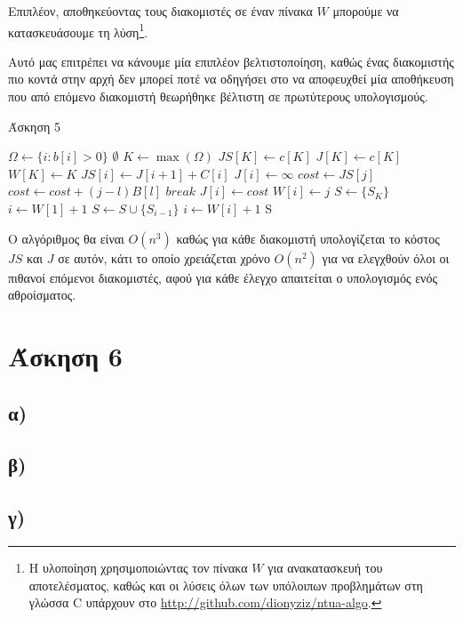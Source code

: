 \documentclass[11pt,a4paper]{book}
\begin{document}
Επιπλέον, αποθηκεύοντας τους διακομιστές σε έναν πίνακα $W$ μπορούμε να κατασκευάσουμε τη λύση\footnote{Η υλοποίηση χρησιμοποιώντας τον πίνακα $W$ για ανακατασκευή του αποτελέσματος, καθώς και οι λύσεις όλων των υπόλοιπων προβλημάτων στη γλώσσα C  υπάρχουν στο \url{http://github.com/dionyziz/ntua-algo}.}.

Αυτό μας επιτρέπει να κάνουμε μία επιπλέον βελτιστοποίηση, καθώς ένας διακομιστής πιο κοντά στην αρχή δεν μπορεί ποτέ να οδηγήσει στο να αποφευχθεί μία αποθήκευση που από επόμενο διακομιστή θεωρήθηκε βέλτιστη σε πρωτύτερους υπολογισμούς.

\begin{algorithm}[H]
\caption{\textgreek{Άσκηση 5}}
\begin{algorithmic}[1]
	\State $\Omega \gets \{ i: b[ i ] > 0 \}$
	\If {$\Omega = \emptyset$}
		\State \Return $\emptyset$
	\EndIf
	\State $K \gets \max( \Omega )$
	\State $JS[ K ] \gets c[ K ]$
	\State $J[ K ] \gets c[ K ]$
	\State $W[ K ] \gets K$
		\State $JS[ i ] \gets J[ i + 1 ] + C[ i ]$
		\State $J[ i ] \gets \infty$
			\State $cost \gets JS[ j ]$
				\State $cost \gets cost + ( j - l )B[ l ]$
					\State $break$
				\EndIf
			\EndFor
				\State $J[ i ] \gets cost$
				\State $W[ i ] \gets j$
			\EndIf
		\EndFor
	\EndFor
	\State $S \gets \{ S_K \}$
	\State $i \gets W[ 1 ] + 1$
		\State $S \gets S \cup \{ S_{i - 1} \}$
		\State $i \gets W[ i ] + 1$
	\EndWhile
	\State \Return S
\EndProcedure
\end{algorithmic}
\end{algorithm}

Ο αλγόριθμος θα είναι $O( n^3 )$ καθώς για κάθε διακομιστή υπολογίζεται το κόστος $JS$ και $J$ σε αυτόν, κάτι το οποίο χρειάζεται χρόνο $O( n^2 )$ για να ελεγχθούν όλοι οι πιθανοί επόμενοι διακομιστές, αφού για κάθε έλεγχο απαιτείται ο υπολογισμός ενός αθροίσματος.

\section*{Άσκηση 6}
\subsection*{α)}
\subsection*{β)}
\subsection*{γ)}
\end{document}

